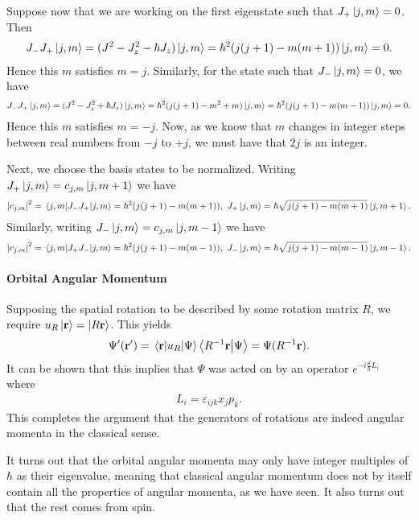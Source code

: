 Suppose now that we are working on the first eigenstate such that $J_{+}\ket{j, m} = 0$. Then
\begin{align*}
	J_{-}J_{+}\ket{j, m} = (J^{2} - J_{z}^{2} - \hbar J_{z})\ket{j, m} = \hbar^{2}(j(j + 1) - m(m + 1))\ket{j, m} = 0.
\end{align*}
Hence this $m$ satisfies $m = j$. Similarly, for the state such that $J_{-}\ket{j, m} = 0$, we have
\begin{align*}
	J_{-}J_{+}\ket{j, m} = (J^{2} - J_{z}^{2} + \hbar J_{z})\ket{j, m} = \hbar^{2}(j(j + 1) - m^{2} + m)\ket{j, m} = \hbar^{2}(j(j + 1) - m(m - 1))\ket{j, m} = 0.
\end{align*}
Hence this $m$ satisfies $m = -j$. Now, as we know that $m$ changes in integer steps between real numbers from $-j$ to $+j$, we must have that $2j$ is an integer.

Next, we choose the basis states to be normalized. Writing $J_{+}\ket{j, m} = c_{j, m}\ket{j, m + 1}$ we have
\begin{align*}
	\abs{c_{j, m}}^{2} = \expval{J_{-}J_{+}}{j, m} = \hbar^{2}(j(j + 1) - m(m + 1)),\ J_{+}\ket{j, m} = \hbar\sqrt{j(j + 1) - m(m + 1)}\ket{j, m + 1}.
\end{align*}
Similarly, writing $J_{-}\ket{j, m} = c_{j, m}\ket{j, m - 1}$ we have
\begin{align*}
	\abs{c_{j, m}}^{2} = \expval{J_{+}J_{-}}{j, m} = \hbar^{2}(j(j + 1) - m(m - 1)),\ J_{-}\ket{j, m} = \hbar\sqrt{j(j + 1) - m(m - 1)}\ket{j, m - 1}.
\end{align*}

\paragraph{Orbital Angular Momentum}
Supposing the spatial rotation to be described by some rotation matrix $R$, we require $u_{R}\ket{\vb{r}} = \ket{R\vb{r}}$. This yields
\begin{align*}
	\Psi^{\prime}(\vb{r}^{\prime}) = \mel{\vb{r}}{u_{R}}{\Psi} \braket{R^{-1}\vb{r}}{\Psi} = \Psi(R^{-1}\vb{r}).
\end{align*}
It can be shown that this implies that $\Psi$ was acted on by an operator $e^{-i\frac{\theta}{\hbar}L_{i}}$ where
\begin{align*}
	L_{i} = \varepsilon_{ijk}x_{j}p_{k}.
\end{align*}
This completes the argument that the generators of rotations are indeed angular momenta in the classical sense.

It turns out that the orbital angular momenta may only have integer multiples of $\hbar$ as their eigenvalue, meaning that classical angular momentum does not by itself contain all the properties of angular momenta, as we have seen. It also turns out that the rest comes from spin.